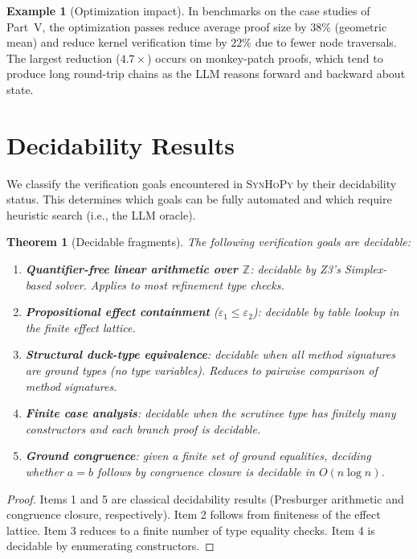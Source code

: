\documentclass[11pt,a4paper]{report}
\theoremstyle{definition}
\newtheorem{example}[definition]{Example}
\theoremstyle{plain}
\newtheorem{theorem}[definition]{Theorem}
\newcommand{\Int}{\mathbb{Z}}
\newcommand{\synhopy}{\textsc{SynHoPy}}
\begin{document}
\begin{example}[Optimization impact]
In benchmarks on the case studies of Part~V, the optimization passes
reduce average proof size by $38\%$ (geometric mean) and reduce kernel
verification time by $22\%$ due to fewer node traversals. The largest
reduction ($4.7\times$) occurs on monkey-patch proofs, which tend to
produce long round-trip chains as the LLM reasons forward and backward
about state.
\end{example}


\section{Decidability Results}
\label{sec:decidability}

We classify the verification goals encountered in \synhopy{} by their
decidability status. This determines which goals can be fully
automated and which require heuristic search (i.e., the LLM oracle).

\begin{theorem}[Decidable fragments]
\label{thm:decidable}
The following verification goals are decidable:
\begin{enumerate}
  \item \textbf{Quantifier-free linear arithmetic over $\Int$}:
    decidable by Z3's Simplex-based solver.
    Applies to most refinement type checks.
  \item \textbf{Propositional effect containment}
    ($\varepsilon_1 \leq \varepsilon_2$):
    decidable by table lookup in the finite effect lattice.
  \item \textbf{Structural duck-type equivalence}: decidable when all
    method signatures are ground types (no type variables).
    Reduces to pairwise comparison of method signatures.
  \item \textbf{Finite case analysis}: decidable when the scrutinee
    type has finitely many constructors and each branch proof is
    decidable.
  \item \textbf{Ground congruence}: given a finite set of ground
    equalities, deciding whether $a = b$ follows by congruence closure
    is decidable in $O(n \log n)$.
\end{enumerate}
\end{theorem}
\begin{proof}
Items 1 and 5 are classical decidability results (Presburger
arithmetic and congruence closure, respectively). Item 2 follows from
finiteness of the effect lattice. Item 3 reduces to a finite number of
type equality checks. Item 4 is decidable by enumerating constructors.
\end{proof}
\end{document}
